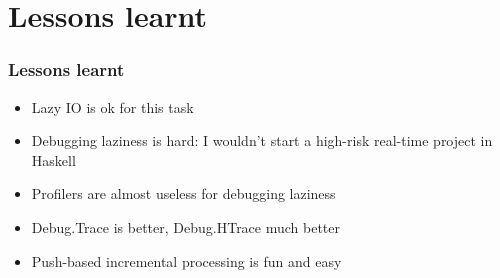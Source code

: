 \documentclass{beamer}
\begin{document}
\section{Lessons learnt}

\begin{frame}
  \frametitle{Lessons learnt}

  \begin{itemize}
    \item Lazy IO is ok for this task
    \item Debugging laziness is hard: I wouldn't start a high-risk real-time project in Haskell
    \item Profilers are almost useless for debugging laziness
    \item Debug.Trace is better, Debug.HTrace much better
    \item Push-based incremental processing is fun and easy
  \end{itemize}
\end{frame}
\end{document}
